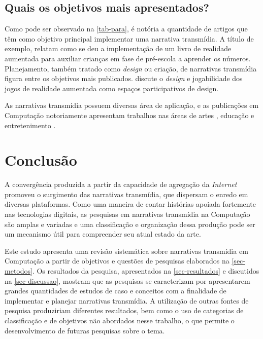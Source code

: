 \documentclass[
article,			%
11pt,				%
oneside,			%
a4paper,			%
english,			%
brazil,				%
sumario=tradicional
]{abntex2}
\begin{document}
  \subsection{Quais os objetivos mais apresentados?}

  Como pode ser observado na \autoref{tab-para}, é notória a quantidade de artigos que têm como objetivo principal implementar uma narrativa transmídia. A título de exemplo,  relatam como se deu a implementação de um livro de realidade aumentada para auxiliar crianças em fase de pré-escola a aprender os números. Planejamento, também tratado como \textit{design} ou criação, de narrativas transmídia figura entre os objetivos mais publicados.  discute o \textit{design} e jogabilidade dos jogos de realidade aumentada como espaços participativos de design.

  As narrativas transmídia possuem diversas área de aplicação, e as publicações em Computação notoriamente apresentam trabalhos nas áreas de artes \cite{santorineos_2009,ha_2012,jung_2012,katifori_2014}, educação \cite{raybourn_2014,xiao_2013,mcauliffe_2011,ballagas_2011} e entretenimento \cite{willis_2013,choi_2010,evans_2014,nandakumar_2014,holler_2014,murakami_2015}.

  \section{Conclusão}

  A convergência produzida a partir da capacidade de agregação da \textit{Internet} promoveu o surgimento das narrativas transmídia, que dispersam o enredo em diversas plataformas. Como uma maneira de contar histórias apoiada fortemente nas tecnologias digitais, as pesquisas em narrativas transmídia na Computação são amplas e variadas e uma classificação e organização dessa produção pode ser um mecanismo útil para compreender seu atual estado da arte.

  Este estudo apresenta uma revisão sistemática sobre narrativas transmídia em Computação a partir de objetivos e questões de pesquisas elaborados na \autoref{sec-metodos}. Os resultados da pesquisa, apresentados na \autoref{sec-resultados} e discutidos na \autoref{sec-discussao}, mostram que as pesquisas se caracterizam por apresentarem grandes quantidades de estudos de caso e conceitos com a finalidade de implementar e planejar narrativas transmídia. A utilização de outras fontes de pesquisa produziriam diferentes resultados, bem como o uso de categorias de classificação e de objetivos não abordados nesse trabalho, o que permite o desenvolvimento de futuras pesquisas sobre o tema.
\end{document}
